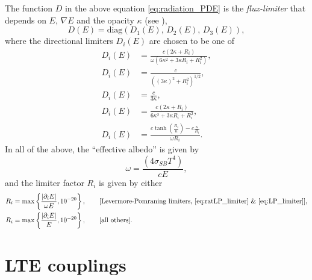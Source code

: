 \documentclass[letterpaper,10pt]{article}
\renewcommand{\(}{\left(}
\renewcommand{\)}{\right)}
\begin{document}
The function $D$ in the above equation \eqref{eq:radiation_PDE} is
the {\em flux-limiter} that depends on $E$, $\nabla E$ and the 
opacity $\kappa$ (see
\cite{HayesNorman2003,ReynoldsHayesPaschosNorman2009}),  
\[
   D(E) = \text{diag}\( D_1(E),\, D_2(E),\, D_3(E) \),
\]
where the directional limiters $D_i(E)$ are chosen to be one of 
\begin{align}
  \label{eq:ratLP_limiter}
   D_i(E) &= \frac{c(2\kappa+R_i)}{\omega(6\kappa^2+3\kappa R_i + R_i^2)}, \\
  \label{eq:Larsen_n2_limiter}
   D_i(E) &= \frac{c}{\left((3\kappa)^2 + R_i^2\right)^{1/2}},  \\
  \label{eq:no_limiter}
   D_i(E) &= \frac{c}{3\kappa}, \\
  \label{eq:Zeus_limiter}
   D_i(E) &= \frac{c(2\kappa+R_i)}{6\kappa^2+3\kappa R_i+R_i^2}, \\
  \label{eq:LP_limiter}
   D_i(E) &= \frac{c \tanh\left(\frac{R_i}{\kappa}\right)-c \frac{\kappa}{R_i}}{\omega R_i}.
\end{align}
In all of the above, the ``effective albedo'' is given by
\begin{equation}
\label{eq:albedo}
  \omega = \frac{(4 \sigma_{SB} T^4)}{c E},
\end{equation}
and the limiter factor $R_i$ is given by either
\begin{align}
  \label{eq:R_zeus}
   R_i &= \max\left\{\frac{|\partial_i E|}{\omega E},
     10^{-20}\right\}, \qquad\text{[Levermore-Pomraning limiters,
     \eqref{eq:ratLP_limiter} \& \eqref{eq:LP_limiter}]}, \\
   R_i &= \max\left\{\frac{|\partial_i E|}{E}, 10^{-20}\right\},
     \qquad\text{[all others]}.
\end{align}



\section{LTE couplings}
\label{sec:lte_model}
\end{document}
